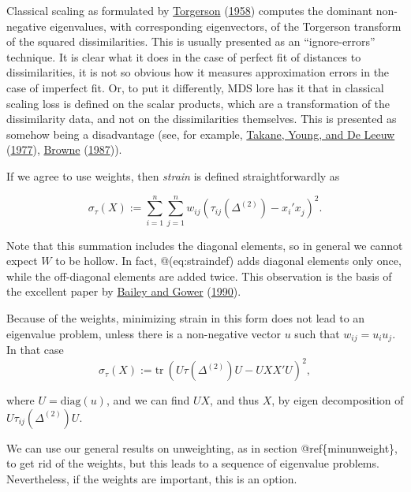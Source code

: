 \documentclass[
  12pt,
]{book}
\theoremstyle{definition}
\theoremstyle{definition}
\theoremstyle{definition}
\theoremstyle{definition}
\theoremstyle{remark}
\begin{document}
Classical scaling as formulated by \protect\hyperlink{ref-torgerson_58}{Torgerson} (\protect\hyperlink{ref-torgerson_58}{1958}) computes the dominant non-negative eigenvalues, with corresponding eigenvectors, of the Torgerson transform of the squared dissimilarities. This is usually presented as an ``ignore-errors'' technique. It is clear what it does in the case of perfect fit of distances to dissimilarities, it is not so obvious how it measures approximation errors in the case of imperfect fit. Or, to put it differently, MDS lore has it that in classical scaling
loss is defined on the scalar products, which are a transformation of the dissimilarity data, and not on the dissimilarities themselves. This is presented as somehow being a
disadvantage (see, for example, \protect\hyperlink{ref-takane_young_deleeuw_A_77}{Takane, Young, and De Leeuw} (\protect\hyperlink{ref-takane_young_deleeuw_A_77}{1977}), \protect\hyperlink{ref-browne_87}{Browne} (\protect\hyperlink{ref-browne_87}{1987})).

If we agree to use weights, then \emph{strain} is defined straightforwardly as

\begin{equation}
\sigma_\tau(X):=\sum_{i=1}^n\sum_{j=1}^nw_{ij}(\tau_{ij}(\Delta^{(2)})-x_i'x_j^{\ })^2.
\label{eq:straindef}
\end{equation}

Note that this summation includes the diagonal elements, so in general we cannot expect \(W\) to be hollow. In fact,
@(eq:straindef) adds diagonal elements only once, while the off-diagonal elements are added twice. This observation is the basis of the excellent paper by \protect\hyperlink{ref-bailey_gower_90}{Bailey and Gower} (\protect\hyperlink{ref-bailey_gower_90}{1990}).

Because of the weights, minimizing strain in this form does not lead to an eigenvalue problem, unless there is a non-negative vector \(u\) such that \(w_{ij}=u_iu_j\). In that case
\begin{equation}
\sigma_\tau(X):=\text{tr}\ (U\tau(\Delta^{(2)})U-UXX'U)^2,
\label{eq:strainuu}
\end{equation}

where \(U=\text{diag}(u)\), and we can find \(UX\), and thus \(X\), by eigen decomposition of \(U\tau_{ij}(\Delta^{(2)})U\).

We can use our general results on unweighting, as in section @ref\{minunweight\}, to get rid of the weights, but this leads to a sequence of eigenvalue problems. Nevertheless, if the weights are important, this is an option.
\end{document}
